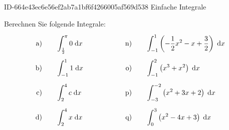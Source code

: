 \begin{exercise}
      {ID-664e43ec6e56ef2ab7a1bf6f4266005af569d538}
      {Einfache Integrale}
  \ifproblem\problem\par
    Berechnen Sie folgende Integrale:
    \begingroup
      \allowdisplaybreaks
      \newcommand{\da}{\;\mathrm{d}a}
      \newcommand{\dt}{\;\mathrm{d}t}
      \newcommand{\dx}{\;\mathrm{d}x}
      \newcommand{\separator}{\qquad&\qquad}%
      \newcommand{\vstrut}{\rule[-3ex]{0pt}{7.25ex}}%
      \newcommand{\exca}{&\int_{\frac{1}{2}}^{\pi}0\dx}%
      \newcommand{\excb}{&\int_{-1}^{1}1\dx}%
      \newcommand{\excc}{&\int_{2}^{4}c\dx}%
      \newcommand{\excd}{&\int_{2}^{4}x\dx}%
      \newcommand{\exce}{&\int_{1}^{3}x^{2}\dx}%
      \newcommand{\excf}{&\int_{3}^{5}x^{3}\dx}%
      \newcommand{\excg}{&\int_{a}^{b}x^{n}\dx}%
      \newcommand{\exch}{&\int_{1}^{3}x^{-3}\dx}%
      \newcommand{\exci}{&\int_{3}^{6}x^{-2}\dx}%
      \newcommand{\excj}{&\int_{a}^{b}(mx+n)\dx}%
      \newcommand{\exck}{&\int_{1}^{4}\sqrt{x}\dx}%
      \newcommand{\excl}{&\int_{0}^{1}\sqrt[3]{x}\dx}%
      \newcommand{\excm}{&\int_{1}^{4}\frac{1}{\sqrt{x}}\dx}%
      \newcommand{\excn}{&\int_{-1}^{1}\left(-\frac{1}{2}x^{2}-x+\frac{3}{2}\right)\dx}%
      \newcommand{\exco}{&\int_{-1}^{2}\left(x^{3}+x^{2}\right)\dx}%
      \newcommand{\excp}{&\int_{-3}^{-2}\left(x^{2}+3x+2\right)\dx}%
      \newcommand{\excq}{&\int_{0}^{3}\left(x^{2}-4x+3\right)\dx}%
      \newcommand{\excr}{&\int_{0}^{1}\left(\frac{3}{2}x-\frac{1}{2\sqrt{x}}\right)\dx}%
      \newcommand{\excs}{&\int_{0}^{\frac{\pi}{2}}\sin(x)\dx}%
      \newcommand{\exct}{&\int_{-\frac{\pi}{2}}^{\frac{\pi}{2}}\cos(x)\dx}%
      \newcommand{\excu}{&\int_{0}^{2\pi}\left(4\sin(x)+8\cos(x)\right)\dx}%
      \newcommand{\excv}{&\int_{0}^{\frac{\pi}{2}}\left(\sin(x)+e^{x}\right)\dx}%
      \newcommand{\excw}{&\int_{0}^{\ln(2)}\pi^{2}\cdot e^{x}\dx}%
      \newcommand{\excx}{&\int_{0}^{4}\left(ax^{2}+bx+c\right)\dx}%
      \newcommand{\excy}{&\int_{0}^{4}\left(ax^{2}+bx+c\right)\da}%
      \newcommand{\excz}{&\int_{0}^{4}\left(ax^{2}+bx+c\right)\dt}%
      \begin{alignat*}{5}
        \text{a)\vstrut}&\quad & \exca & \separator & \text{n)\vstrut}&\quad & \excn \\
        \text{b)\vstrut}&\quad & \excb & \separator & \text{o)\vstrut}&\quad & \exco \\
        \text{c)\vstrut}&\quad & \excc & \separator & \text{p)\vstrut}&\quad & \excp \\
        \text{d)\vstrut}&\quad & \excd & \separator & \text{q)\vstrut}&\quad & \excq \\

\end{alignat*}
\end{exercise}
